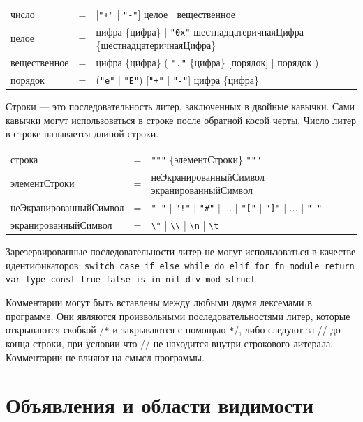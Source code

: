 \documentclass[a4paper,12pt]{article}
\newcommand{\lit}[1]{\texttt{"#1"}}
\begin{document}
    \vspace{0.5cm}
    \begin{tabular}{l c l}
        число & = & [\lit{+} | \lit{-}] целое | вещественное \\
        целое & = & цифра \{цифра\} | \lit{0x} шестнадцатеричнаяЦифра \{шестнадцатеричнаяЦифра\}\\
        вещественное & = & цифра \{цифра\} ( \lit{.} \{цифра\} [порядок] | порядок ) \\
        порядок & = & (\lit{e} | \lit{E}) [\lit{+} | \lit{-}] цифра \{цифра\}
    \end{tabular}
    \vspace{0.5cm}

    Строки — это последовательность литер, заключенных в двойные кавычки. Сами кавычки могут использоваться в строке после обратной косой черты. Число литер в строке называется длиной строки.

    \vspace{0.5cm}
    \begin{tabular}{l c p{10cm}}
        строка & = & \lit{"} \{элементСтроки\} \lit{"} \\
        элементСтроки & = & неЭкранированныйСимвол | экранированныйСимвол \\
        неЭкранированныйСимвол & = & \lit{ } | \lit{!} | \lit{\#} | ... | \lit{[} | \lit{]} | ... | \lit{\string~} \\
        экранированныйСимвол & = & \texttt{\textbackslash "} | \texttt{\textbackslash \textbackslash} | \texttt{\textbackslash n} | \texttt{\textbackslash t}
    \end{tabular}
    \vspace{0.5cm}

    Зарезервированные последовательности литер не могут использоваться в качестве идентификаторов: \texttt{switch case if else while do elif for fn module return var type const true false is in nil div mod struct}


    \vspace{0.5cm}
    Комментарии могут быть вставлены между любыми двумя лексемами в программе. Они являются произвольными последовательностями литер, которые открываются скобкой /\texttt{*} и закрываются с помощью \texttt{*}/, либо следуют за // до конца строки, при условии что // не находится внутри строкового литерала. Комментарии не влияют на смысл программы.




    \section{Объявления и области видимости}
\end{document}
